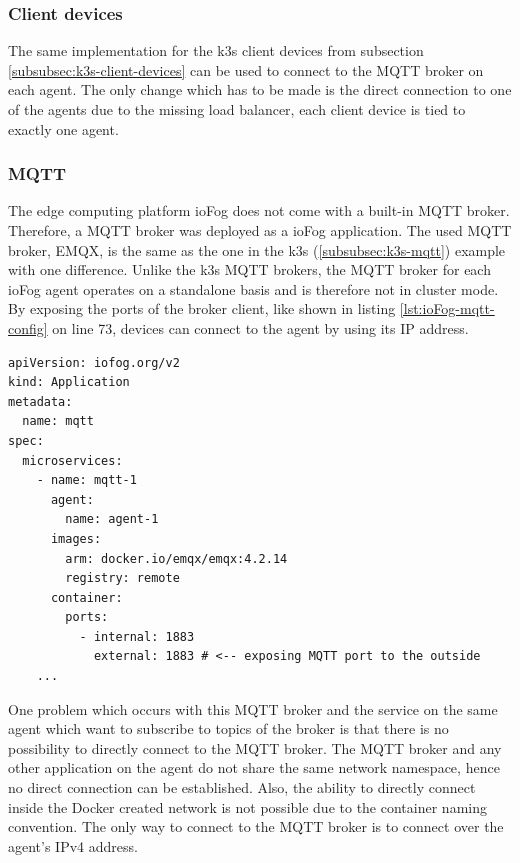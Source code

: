 \subsubsection*{Client devices}
The same implementation for the k3s client devices from subsection \ref{subsubsec:k3s-client-devices} can be used to connect to the MQTT broker on each agent. The only change which has to be made is the direct connection to one of the agents due to the missing load balancer, each client device is tied to exactly one agent.

\subsubsection*{MQTT}
The edge computing platform ioFog does not come with a built-in MQTT broker. Therefore, a MQTT broker was deployed as a ioFog application. The used MQTT broker, EMQX, is the same as the one in the k3s (\ref{subsubsec:k3s-mqtt}) example with one difference. Unlike the k3s MQTT brokers, the MQTT broker for each ioFog agent operates on a standalone basis and is therefore not in cluster mode. By exposing the ports of the broker client, like shown in listing \ref{lst:ioFog-mqtt-config} on line 73, devices can connect to the agent by using its IP address.

\begin{lstlisting}[caption={Example MQTT microservice configuration.},label={lst:ioFog-mqtt-config},captionpos=b]
apiVersion: iofog.org/v2
kind: Application
metadata:
  name: mqtt
spec:
  microservices:
    - name: mqtt-1
      agent:
        name: agent-1
      images:
        arm: docker.io/emqx/emqx:4.2.14
        registry: remote
      container:
        ports:
          - internal: 1883
            external: 1883 # <-- exposing MQTT port to the outside
    ...
\end{lstlisting}

One problem which occurs with this MQTT broker and the service on the same agent which want to subscribe to topics of the broker is that there is no possibility to directly connect to the MQTT broker. The \gls{MQTT} broker and any other application on the agent do not share the same network namespace, hence no direct connection can be established. Also, the ability to directly connect inside the Docker created network is not possible due to the container naming convention. The only way to connect to the MQTT broker is to connect over the agent's IPv4 address.


